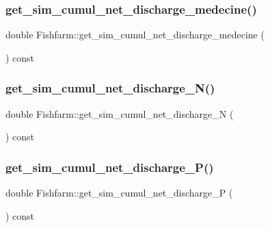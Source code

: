\subsubsection{\texorpdfstring{get\_sim\_cumul\_net\_discharge\_medecine()}{get\_sim\_cumul\_net\_discharge\_medecine()}}
{\footnotesize\ttfamily double Fishfarm\+::get\+\_\+sim\+\_\+cumul\+\_\+net\+\_\+discharge\+\_\+medecine (\begin{DoxyParamCaption}{ }\end{DoxyParamCaption}) const}

\mbox{\label{class_fishfarm_a2263bd93823f16fedf93f16391b2f9ea}} 
\subsubsection{\texorpdfstring{get\_sim\_cumul\_net\_discharge\_N()}{get\_sim\_cumul\_net\_discharge\_N()}}
{\footnotesize\ttfamily double Fishfarm\+::get\+\_\+sim\+\_\+cumul\+\_\+net\+\_\+discharge\+\_\+N (\begin{DoxyParamCaption}{ }\end{DoxyParamCaption}) const}

\mbox{\label{class_fishfarm_a1d59bc456ec95b3758a9b95f4956305a}} 
\subsubsection{\texorpdfstring{get\_sim\_cumul\_net\_discharge\_P()}{get\_sim\_cumul\_net\_discharge\_P()}}
{\footnotesize\ttfamily double Fishfarm\+::get\+\_\+sim\+\_\+cumul\+\_\+net\+\_\+discharge\+\_\+P (\begin{DoxyParamCaption}{ }\end{DoxyParamCaption}) const}

\mbox{\label{class_fishfarm_a8234993c5d79aaa2001bc5e1aa655d50}} 
